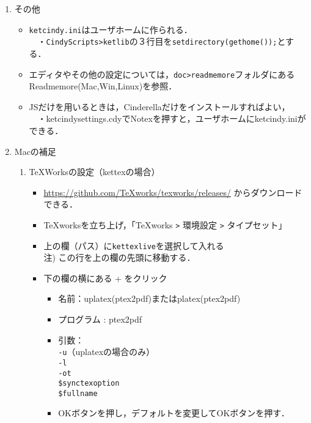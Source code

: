 \documentclass{ujarticle}
\begin{document}
\begin{enumerate}[\bf\large 1.]
\item  その他\vspace{-2mm}
\begin{itemize}
\item \verb|ketcindy.ini|はユーザホームに作られる．\\
　・\verb|CindyScripts>ketlib|の３行目を\verb|setdirectory(gethome());|とする．

\item エディタやその他の設定については，\verb|doc>readmemore|フォルダにあるReadmemore(Mac,Win,Linux)を参照．
\item \ketcindy JSだけを用いるときは，Cinderellaだけをインストールすればよい，\\
　・ketcindysettings.cdyでNotexを押すと，ユーザホームにketcindy.iniができる．
\end{itemize}


\newpage

\item Macの補足

\begin{enumerate}[(1)]

\item TeXWorksの設定（kettexの場合）
  \begin{itemize}
  \item \url{https://github.com/TeXworks/texworks/releases/} からダウンロードできる．
  \item TeXworksを立ち上げ，「TeXworks \verb|>| 環境設定 \verb|>| タイプセット」
  \item 上の欄（パス）に\verb|kettexlive|を選択して入れる\\
  \hspace*{10mm}注) この行を上の欄の先頭に移動する．
  \item 下の欄の横にある + をクリック
    \begin{itemize}
    \item 名前：uplatex(ptex2pdf)またはplatex(ptex2pdf)
    \item プログラム : ptex2pdf
    \item 引数：\\
    \hspace*{10mm} \verb|-u|（uplatexの場合のみ）\\
    \hspace*{10mm} \verb|-l|\\
    \hspace*{10mm} \verb|-ot|\\
    \hspace*{10mm}  \verb|$synctexoption|\\
    \hspace*{10mm}  \verb|$fullname|
    \item[]OKボタンを押し，デフォルトを変更してOKボタンを押す．
    \end{itemize}
  \end{itemize}


\end{enumerate}
\end{enumerate}
\end{document}
